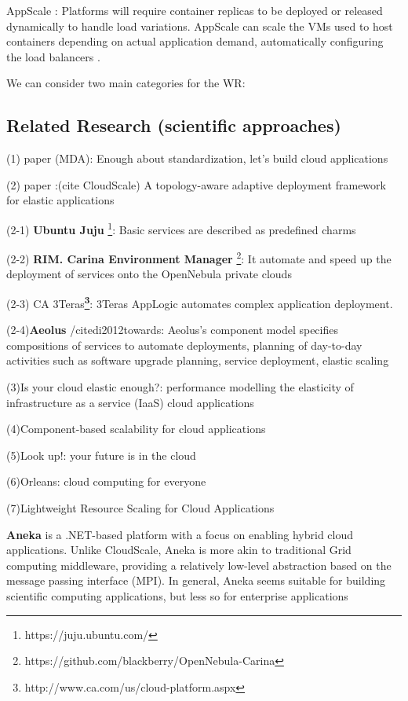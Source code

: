 \documentclass{sig-alternate}
\begin{document}
{AppScale \cite{chohan2009appscale}: Platforms will require container replicas to be deployed or released dynamically to handle load variations. AppScale can scale the VMs used to host containers depending on actual application demand, automatically configuring the load balancers \cite{vaquero2011dynamically}. 


We can consider two main categories for the WR: 
\subsection{Related Research (scientific approaches)}

(1) paper \cite{miranda2012enough} (MDA): Enough about standardization, let's build cloud applications

(2) paper \cite{keller2013topology}:(cite CloudScale) A topology-aware adaptive deployment framework for elastic applications 

(2-1) \textbf{Ubuntu Juju }\footnote{https://juju.ubuntu.com/}: Basic services are described as predefined charms

(2-2) \textbf{RIM. Carina Environment Manager} \footnote{https://github.com/blackberry/OpenNebula-Carina}: It automate and speed up the deployment of services onto the OpenNebula private clouds

(2-3) CA 3Teras\textbf \footnote{http://www.ca.com/us/cloud-platform.aspx}: 3Teras AppLogic automates complex application deployment.

(2-4)\textbf{Aeolus} /cite{di2012towards}: Aeolus’s component model specifies compositions of services to automate deployments, planning of day-to-day activities such as software upgrade planning, service deployment, elastic scaling
 
(3)Is your cloud elastic enough?: performance modelling the elasticity of infrastructure as a service (IaaS) cloud applications \cite{brebner2012your}

(4)Component-based scalability for cloud applications \cite {kachele2013component}

(5)Look up!: your future is in the cloud \cite{larus2013look}

(6)Orleans: cloud computing for everyone \cite{bykov2011orleans}

(7)Lightweight Resource Scaling for Cloud Applications \cite{han2012lightweight}
 
\textbf{Aneka} is a .NET-based platform with a focus on enabling hybrid cloud applications. Unlike CloudScale, Aneka is more akin to traditional Grid computing middleware, providing a relatively low-level abstraction based on the message passing interface (MPI). In general, Aneka seems suitable for building scientific computing applications, but less so for enterprise applications ~\cite{Leitner2013}

}
\end{document}
